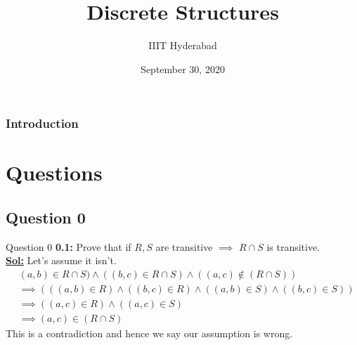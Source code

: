 \documentclass[xcolor=svgnames]{beamer}
\title[Discrete Structures]{Discrete Structures} %
\author{IIIT Hyderabad} %
\institute[] %
{
Monsoon 2020 \\ %
\medskip
\textit{Tutorial 5} %
}
\date{September 30, 2020} %
\begin{document}
\begin{frame}
\titlepage %
\end{frame}

\begin{frame}
\frametitle{Introduction} %
\tableofcontents %
\end{frame}



\section{Questions}

\subsection{Question 0}
\begin{frame}{Question 0}
    \textbf{0.1:} Prove that if $R,S$ are transitive $\implies$ $R \cap S$ is transitive.
    \\ \textbf{\underline{Sol:}} Let's assume it isn't.
    \begin{align*}
        & (a,b) \in R \cap S) \land ((b,c) \in R \cap S) \land ((a,c) \notin (R \cap S))
        \\ & \implies (((a,b) \in R) \land ((b,c) \in R) 
 \land ((a,b) \in S) \land ((b,c) \in S))
        \\ & \implies ((a,c) \in R) \land ((a,c) \in S) 
        \\ & \implies (a,c) \in (R \cap S)
    \end{align*}
    This is a contradiction and hence we say our assumption is wrong.
\end{frame}
\end{document}
